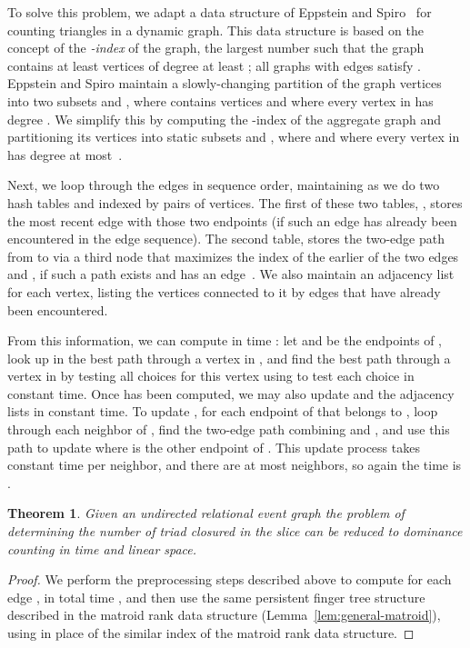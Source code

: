 \documentclass[11pt]{article}
\newtheorem{theorem}{Theorem}
\begin{document}
To solve this problem, we adapt a data structure of Eppstein and Spiro~\cite{EppSpi-WADS-09} for counting triangles in a dynamic graph. This data structure is based on the concept of the \emph{-index} of the graph, the largest number  such that the graph contains at least  vertices of degree at least ; all graphs with  edges satisfy .  Eppstein and Spiro maintain a slowly-changing partition of the graph vertices into two subsets  and , where  contains  vertices and where every vertex in  has degree . We simplify this by computing the -index of the aggregate graph and partitioning its vertices into static subsets  and , where  and where every vertex in  has degree at most~.

Next, we loop through the edges in sequence order, maintaining as we do two hash tables  and  indexed by pairs of vertices. The first of these two tables, , stores the most recent edge with those two endpoints (if such an edge has already been encountered in the edge sequence). The second table,  stores the two-edge path from  to  via a third node  that maximizes the index of the earlier of the two edges  and , if  such a path exists and  has an edge~. We also maintain an adjacency list for each vertex, listing the vertices connected to it by edges that have already been encountered.

From this information, we can compute  in time : let  and  be the endpoints of , look up in  the best path through a vertex in , and find the best path through a vertex in  by testing all  choices for this vertex using  to test each choice in constant time. Once  has been computed, we may also update  and the adjacency lists in constant time. To update , for each endpoint  of  that belongs to , loop through each neighbor  of , find the two-edge path combining  and , and use this path to update  where  is the other endpoint of . This update process takes constant time per neighbor, and there are at most  neighbors, so again the time is .

\begin{theorem}
Given an undirected relational event graph  the problem of determining the number of triad closured in the slice  can be reduced to dominance counting in  time and linear space.
\end{theorem}
\begin{proof}
We perform the preprocessing steps described above to compute  for each edge , in total time , and then use the same persistent finger tree structure described in the matroid rank data structure (Lemma~\ref{lem:general-matroid}), using  in place of the similar index  of the matroid rank data structure.
\end{proof} 
\end{document}
